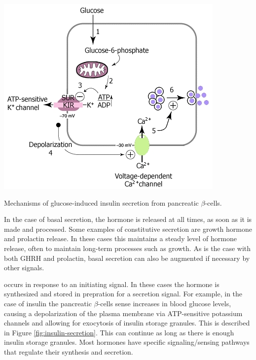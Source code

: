 \documentclass{tufte-handout}
\begin{document}
\begin{marginfigure}
  \includegraphics{figures/insulin-secretion}
  \caption{Mechanisms of glucose-induced insulin secretion from pancreatic $\beta$-cells.}
    \label{fig:insulin-secretion}
\end{marginfigure}

  In the case of basal secretion, the hormone is released at all times, as soon as it is made and processed.  Some examples of constitutive secretion are growth hormone and prolactin release.  In these cases this maintains a steady level of hormone release, often to maintain long-term processes such as growth.  As is the case with both GHRH and prolactin, basal secretion can also be augmented if necessary by other signals.

 occurs in response to an initiating signal.  In these cases the hormone is synthesized and stored in prepration for a secretion signal.  For example, in the case of insulin the pancreatic $\beta$-cells sense increases in blood glucose levels, causing a depolarization of the plasma membrane via ATP-sensitive potassium channels and allowing for exocytosis of insulin storage granules.  This is described in Figure \ref{fig:insulin-secretion}.  This can continue as long as there is enough insulin storage granules.  Most hormones have specific signaling/sensing pathways that regulate their synthesis and secretion.
\end{document}
